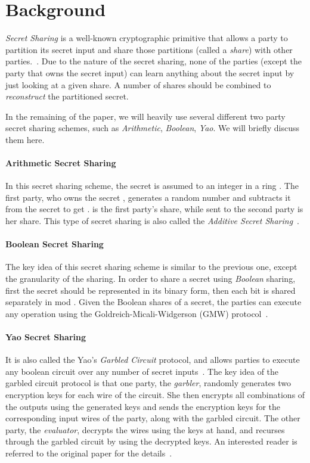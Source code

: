 \documentclass{llncs}
\begin{document}
\section{Background}
\label{sec:background}

\emph{Secret Sharing} is a well-known cryptographic primitive that allows a party to partition its secret input and share those partitions (called a \emph{share}) with other parties.~\cite{cite:shamir1979share}. Due to the nature of the secret sharing, none of the parties (except the party that owns the secret input) can learn anything about the secret input by just looking at a given share. A number of shares should be combined to \emph{reconstruct} the partitioned secret. 

In the remaining of the paper, we will heavily use several different two party secret sharing schemes, such as \emph{Arithmetic}, \emph{Boolean}, \emph{Yao}. We will briefly discuss them here.

\paragraph{Arithmetic Secret Sharing} In this secret sharing scheme, the secret is assumed to an integer  in a ring . The first party, who owns the secret , generates a random number  and subtracts it from the secret to get .  is the first party's share, while  sent to the second party is her share. This type of secret sharing is also called the \emph{Additive Secret Sharing}~\cite{cite:cramer2000general}. 

\paragraph{Boolean Secret Sharing} The key idea of this secret sharing scheme is similar to the previous one,  except the granularity of the sharing. In order to share a secret using \emph{Boolean} sharing, first the secret should be represented in its binary form, then each bit is shared separately in mod . Given the Boolean shares of a secret, the parties can execute any operation using the Goldreich-Micali-Widgerson (GMW) protocol~\cite{cite:goldwasser1987play}. 

\paragraph{Yao Secret Sharing} It is also called the Yao's \emph{Garbled Circuit} protocol, and allows parties to execute any boolean circuit over any number of secret inputs~\cite{cite:yao1986generate}. The key idea of the garbled circuit protocol is that one party, the \emph{garbler}, randomly generates two encryption keys  for each wire  of the circuit. She then encrypts all combinations of the outputs using the generated keys and sends the encryption keys for the corresponding input wires of the party, along with the garbled circuit. The other party, the \emph{evaluator}, decrypts the wires using the keys at hand, and recurses through the garbled circuit by using the decrypted keys. An interested reader is referred to the original paper for the details~\cite{cite:yao1986generate}. 
\end{document}
